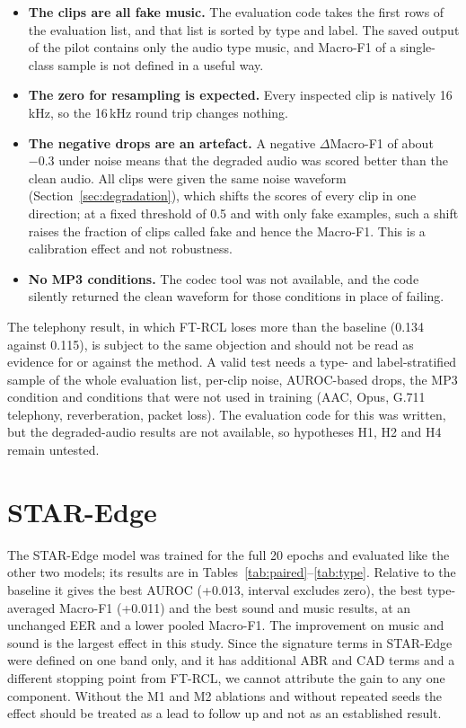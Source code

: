 \begin{itemize}
  \item \textbf{The clips are all fake music.} The evaluation code takes the first rows of the evaluation list, and that list is sorted by type and label. The saved output of the pilot contains only the audio type music, and Macro-F1 of a single-class sample is not defined in a useful way.
  \item \textbf{The zero for resampling is expected.} Every inspected clip is natively 16\,kHz, so the 16\,kHz round trip changes nothing.
  \item \textbf{The negative drops are an artefact.} A negative $\Delta$Macro-F1 of about $-0.3$ under noise means that the degraded audio was scored better than the clean audio. All clips were given the same noise waveform (Section~\ref{sec:degradation}), which shifts the scores of every clip in one direction; at a fixed threshold of 0.5 and with only fake examples, such a shift raises the fraction of clips called fake and hence the Macro-F1. This is a calibration effect and not robustness.
  \item \textbf{No MP3 conditions.} The codec tool was not available, and the code silently returned the clean waveform for those conditions in place of failing.
\end{itemize}



The telephony result, in which FT-RCL loses more than the baseline (0.134 against 0.115), is subject to the same objection and should not be read as evidence for or against the method. A valid test needs a type- and label-stratified sample of the whole evaluation list, per-clip noise, AUROC-based drops, the MP3 condition and conditions that were not used in training (AAC, Opus, G.711 telephony, reverberation, packet loss). The evaluation code for this was written, but the degraded-audio results are not available, so hypotheses H1, H2 and H4 remain untested.

\section{STAR-Edge}
\label{sec:star-edge}

The STAR-Edge model was trained for the full 20 epochs and evaluated like the other two models; its results are in Tables~\ref{tab:paired}--\ref{tab:type}. Relative to the baseline it gives the best AUROC (+0.013, interval excludes zero), the best type-averaged Macro-F1 (+0.011) and the best sound and music results, at an unchanged EER and a lower pooled Macro-F1. The improvement on music and sound is the largest effect in this study. Since the signature terms in STAR-Edge were defined on one band only, and it has additional ABR and CAD terms and a different stopping point from FT-RCL, we cannot attribute the gain to any one component. Without the M1 and M2 ablations and without repeated seeds the effect should be treated as a lead to follow up and not as an established result.

